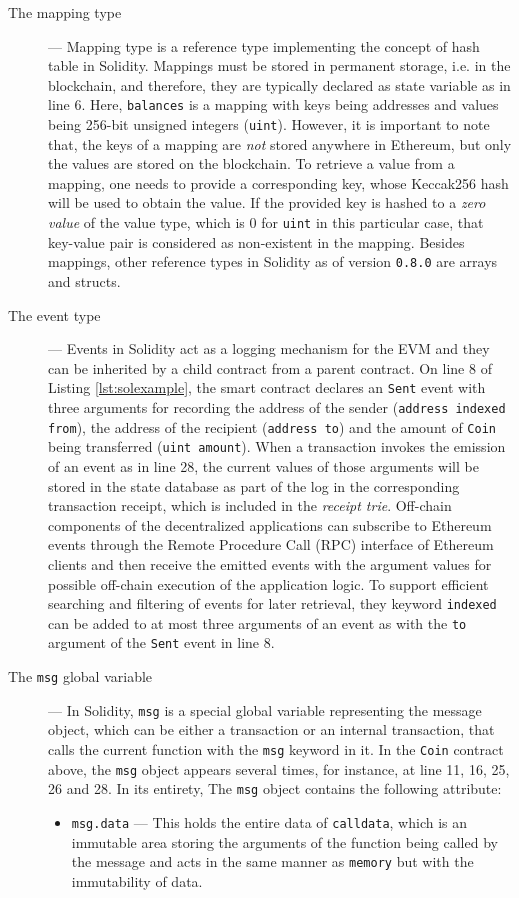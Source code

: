 \begin{description}
\item[The mapping type] --- Mapping type is a reference type implementing the concept of hash table in Solidity. Mappings must be stored in permanent storage, i.e. in the blockchain, and therefore, they are typically declared as state variable as in line 6. Here, \texttt{balances} is a mapping with keys being addresses and values being 256-bit unsigned integers (\texttt{uint}). However, it is important to note that, the keys of a mapping are \textit{not} stored anywhere in Ethereum, but only the values are stored on the blockchain. To retrieve a value from a mapping, one needs to provide a corresponding key, whose Keccak256 hash will be used to obtain the value. If the provided key is hashed to a \textit{zero value} of the value type, which is 0 for \texttt{uint} in this particular case, that key-value pair is considered as non-existent in the mapping. Besides mappings, other reference types in Solidity as of version \texttt{0.8.0} are arrays and structs.
	
\item[The event type] --- Events in Solidity act as a logging mechanism for the EVM and they can be inherited by a child contract from a parent contract. On line 8 of Listing \ref{lst:solexample}, the smart contract declares an \texttt{Sent} event with three arguments for recording the address of the sender (\texttt{address indexed from}), the address of the recipient (\texttt{address to}) and the amount of \texttt{Coin} being transferred (\texttt{uint amount}). When a transaction invokes the emission of an event as in line 28, the current values of those arguments will be stored in the state database as part of the log in the corresponding transaction receipt, which is included in the \textit{receipt trie}. Off-chain components of the decentralized applications can subscribe to Ethereum events through the Remote Procedure Call (RPC) interface of Ethereum clients and then receive the emitted events with the argument values for possible off-chain execution of the application logic. To support efficient searching and filtering of events for later retrieval, they keyword \texttt{indexed} can be added to at most three arguments of an event as with the \texttt{to} argument of the \texttt{Sent} event in line 8.

\item[The \texttt{msg} global variable] --- In Solidity, \texttt{msg} is a special global variable representing the message object, which can be either a transaction or an internal transaction, that calls the current function with the \texttt{msg} keyword in it. In the \texttt{Coin} contract above, the \texttt{msg} object appears several times, for instance, at line 11, 16, 25, 26 and 28. In its entirety, The \texttt{msg} object contains the following attribute:
		\begin{itemize}
			\item \texttt{msg.data} --- This holds the entire data of \texttt{calldata}, which is an immutable area storing the arguments of the function being called by the message and acts in the same manner as \texttt{memory} but with the immutability of data.


\end{itemize}
\end{description}
